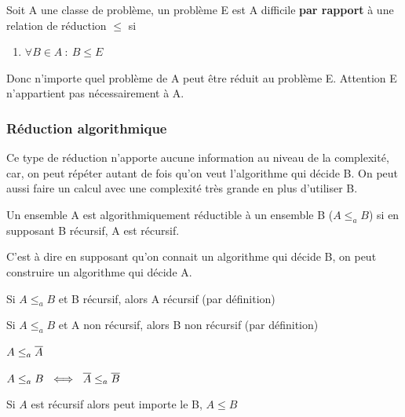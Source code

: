 \begin{mydef}[A-difficile]
	Soit A une classe de problème, un problème E est A difficile
	\textbf{par rapport} à une relation de réduction $\leq$ si 
	\begin{enumerate}
		\item $\forall B \in A \ : \ B \leq E$
	\end{enumerate}
\end{mydef}
	
\begin{myrem}
	Donc n'importe quel problème de A peut être réduit au problème E. 
	Attention E n'appartient pas nécessairement à A.
\end{myrem}


\subsubsection{Réduction algorithmique}
Ce type de réduction n'apporte aucune information au niveau de la complexité, car, on 
peut répéter autant de fois qu'on veut l'algorithme qui décide B. On peut aussi 
faire un calcul avec une complexité très grande en plus d'utiliser B.

\begin{mydef}
	Un ensemble A est algorithmiquement réductible à un ensemble B 
	($A\leq_a B$) si en supposant B récursif, A est récursif.
\end{mydef}

\begin{myrem}
	C'est à dire en supposant qu'on connait un algorithme qui décide B, on 
	peut construire un algorithme qui décide A.
\end{myrem}

\begin{myprop}
	Si $A \leq_a B$ et B récursif, alors A récursif (par définition)
\end{myprop}

\begin{myprop}
	Si $A \leq_a B$ et A non récursif, alors B non récursif (par définition)
\end{myprop}

\begin{myprop}
	$A \leq_a \overline{A}$
\end{myprop}

\begin{myprop}
	$A \leq_a B \ \iff \ \overline{A} \leq_a \overline{B}$
\end{myprop}

\begin{myprop}
	Si $A$ est récursif alors peut importe le B, $A \leq B$
\end{myprop}

